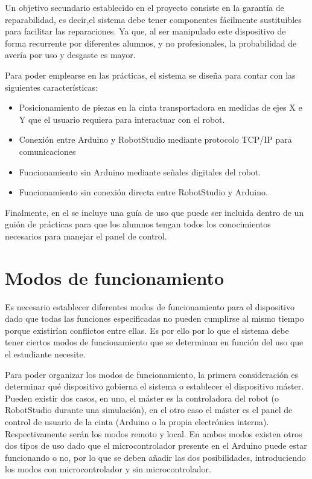 Un objetivo secundario establecido en el proyecto consiste en la garantía de reparabilidad, es decir,el sistema debe tener componentes fácilmente sustituibles para facilitar las reparaciones. Ya que, al ser manipulado este dispositivo de forma recurrente por diferentes alumnos, y no profesionales, la probabilidad de avería por uso y desgaste es mayor.

Para poder emplearse en las prácticas, el sistema se diseña para contar con las siguientes características:
\begin{itemize}
	\item Posicionamiento de piezas en la cinta transportadora en medidas de ejes X e Y que el usuario requiera para interactuar con el robot.
	\item Conexión entre Arduino y RobotStudio mediante protocolo TCP/IP para comunicaciones
	\item Funcionamiento sin Arduino mediante señales digitales del robot.
	\item Funcionamiento sin conexión directa entre RobotStudio y Arduino.
\end{itemize}

Finalmente, en el  se incluye una guía de uso que puede ser incluida dentro de un guión de prácticas para que los alumnos tengan todos los conocimientos necesarios para manejar el panel de control.

\section{Modos de funcionamiento}\label{sec-00}

Es necesario establecer diferentes modos de funcionamiento para el dispositivo dado que todas las funciones especificadas no pueden cumplirse al mismo tiempo porque existirían conflictos entre ellas. Es por ello por lo que el sistema debe tener ciertos modos de funcionamiento que se determinan en función del uso que el estudiante necesite.

Para poder organizar los modos de funcionamiento, la primera consideración es determinar qué dispositivo gobierna el sistema o  establecer el dispositivo máster. Pueden existir dos casos, en uno,  el máster es la controladora del robot (o RobotStudio durante una simulación), en el otro caso el máster es el panel de control de usuario de la cinta (Arduino o la propia electrónica interna). Respectivamente serán los modos remoto y local.
En ambos modos existen otros dos tipos de uso dado que el microcontrolador presente en el Arduino puede estar funcionando o no, por lo que se deben añadir las dos posibilidades, introduciendo los modos con microcontrolador y sin microcontrolador. 

